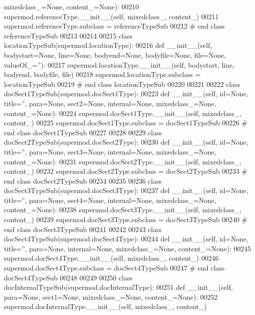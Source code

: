 \begin{DoxyCode}
      mixedclass\_=None, content\_=None):
00210         supermod.referenceType.\_\_init\_\_(self, mixedclass\_, content\_)
00211 supermod.referenceType.subclass = referenceTypeSub
00212 \textcolor{comment}{# end class referenceTypeSub}
00213 
00214 
00215 \textcolor{keyword}{class }locationTypeSub(supermod.locationType):
00216     \textcolor{keyword}{def }__init__(self, bodystart=None, line=None, bodyend=None, bodyfile=None, file=None, valueOf\_=''):
00217         supermod.locationType.\_\_init\_\_(self, bodystart, line, bodyend, bodyfile, file)
00218 supermod.locationType.subclass = locationTypeSub
00219 \textcolor{comment}{# end class locationTypeSub}
00220 
00221 
00222 \textcolor{keyword}{class }docSect1TypeSub(supermod.docSect1Type):
00223     \textcolor{keyword}{def }__init__(self, id=None, title='', para=None, sect2=None, internal=None, mixedclass\_=None, 
      content\_=None):
00224         supermod.docSect1Type.\_\_init\_\_(self, mixedclass\_, content\_)
00225 supermod.docSect1Type.subclass = docSect1TypeSub
00226 \textcolor{comment}{# end class docSect1TypeSub}
00227 
00228 
00229 \textcolor{keyword}{class }docSect2TypeSub(supermod.docSect2Type):
00230     \textcolor{keyword}{def }__init__(self, id=None, title='', para=None, sect3=None, internal=None, mixedclass\_=None, 
      content\_=None):
00231         supermod.docSect2Type.\_\_init\_\_(self, mixedclass\_, content\_)
00232 supermod.docSect2Type.subclass = docSect2TypeSub
00233 \textcolor{comment}{# end class docSect2TypeSub}
00234 
00235 
00236 \textcolor{keyword}{class }docSect3TypeSub(supermod.docSect3Type):
00237     \textcolor{keyword}{def }__init__(self, id=None, title='', para=None, sect4=None, internal=None, mixedclass\_=None, 
      content\_=None):
00238         supermod.docSect3Type.\_\_init\_\_(self, mixedclass\_, content\_)
00239 supermod.docSect3Type.subclass = docSect3TypeSub
00240 \textcolor{comment}{# end class docSect3TypeSub}
00241 
00242 
00243 \textcolor{keyword}{class }docSect4TypeSub(supermod.docSect4Type):
00244     \textcolor{keyword}{def }__init__(self, id=None, title='', para=None, internal=None, mixedclass\_=None, content\_=None):
00245         supermod.docSect4Type.\_\_init\_\_(self, mixedclass\_, content\_)
00246 supermod.docSect4Type.subclass = docSect4TypeSub
00247 \textcolor{comment}{# end class docSect4TypeSub}
00248 
00249 
00250 \textcolor{keyword}{class }docInternalTypeSub(supermod.docInternalType):
00251     \textcolor{keyword}{def }__init__(self, para=None, sect1=None, mixedclass\_=None, content\_=None):
00252         supermod.docInternalType.\_\_init\_\_(self, mixedclass\_, content\_)

\end{DoxyCode}
